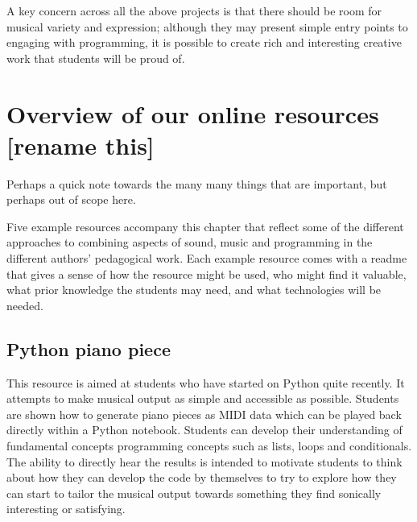 

A key concern across all the above projects is that there should be room for musical variety and expression; although they may present simple entry points to engaging with programming, it is possible to create rich and interesting creative work that students will be proud of.



\section{Overview of our online resources [rename this]} \label{sec:resources}



Perhaps a quick note towards the many many things that are important, but perhaps out of scope here.

Five example resources accompany this chapter that reflect some of the different approaches to combining aspects of sound, music and programming in the different authors' pedagogical work. Each example resource comes with a readme that gives a sense of how the resource might be used, who might find it valuable, what prior knowledge the students may need, and what technologies will be needed.

\subsection{Python piano piece}
This resource is aimed at students who have started on Python quite recently. It attempts to make musical output as simple and accessible as possible. Students are shown how to generate piano pieces as MIDI data which can be played back directly within a Python notebook. Students can develop their understanding of fundamental concepts programming concepts such as lists, loops and conditionals. The ability to directly hear the results is intended to motivate students to think about how they can develop the code by themselves to try to explore how they can start to tailor the musical output towards something they find sonically interesting or satisfying.

